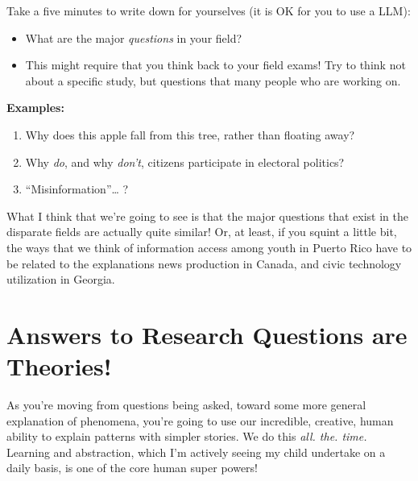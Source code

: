 \documentclass[
  letterpaper,
  DIV=11,
  numbers=noendperiod]{scrreprt}
\providecommand{\tightlist}{%
  \setlength{\itemsep}{0pt}\setlength{\parskip}{0pt}}\usepackage{longtable,booktabs,array}
\begin{document}
\begin{tcolorbox}[enhanced jigsaw, bottomtitle=1mm, coltitle=black, colback=white, colframe=quarto-callout-note-color-frame, title=\textcolor{quarto-callout-note-color}{\faInfo}\hspace{0.5em}{1. Research Questions}, opacityback=0, arc=.35mm, titlerule=0mm, leftrule=.75mm, toptitle=1mm, rightrule=.15mm, opacitybacktitle=0.6, colbacktitle=quarto-callout-note-color!10!white, toprule=.15mm, left=2mm, bottomrule=.15mm, breakable]

Take a five minutes to write down for yourselves (it is OK for you to
use a LLM):

\begin{itemize}
\tightlist
\item
  What are the major \emph{questions} in your field?
\item
  This might require that you think back to your field exams! Try to
  think not about a specific study, but questions that many people who
  are working on.
\end{itemize}

\textbf{Examples:}

\begin{enumerate}
\def\labelenumi{\arabic{enumi}.}
\tightlist
\item
  Why does this apple fall from this tree, rather than floating away?
\item
  Why \emph{do}, and why \emph{don't}, citizens participate in electoral
  politics?
\item
  ``Misinformation''\ldots{} ?
\end{enumerate}

\end{tcolorbox}

What I think that we're going to see is that the major questions that
exist in the disparate fields are actually quite similar! Or, at least,
if you squint a little bit, the ways that we think of information access
among youth in Puerto Rico have to be related to the explanations news
production in Canada, and civic technology utilization in Georgia.


\chapter{Answers to Research Questions are
Theories!}\label{answers-to-research-questions-are-theories}

As you're moving from questions being asked, toward some more general
explanation of phenomena, you're going to use our incredible, creative,
human ability to explain patterns with simpler stories. We do this
\emph{all. the. time.} Learning and abstraction, which I'm actively
seeing my child undertake on a daily basis, is one of the core human
super powers!
\end{document}
